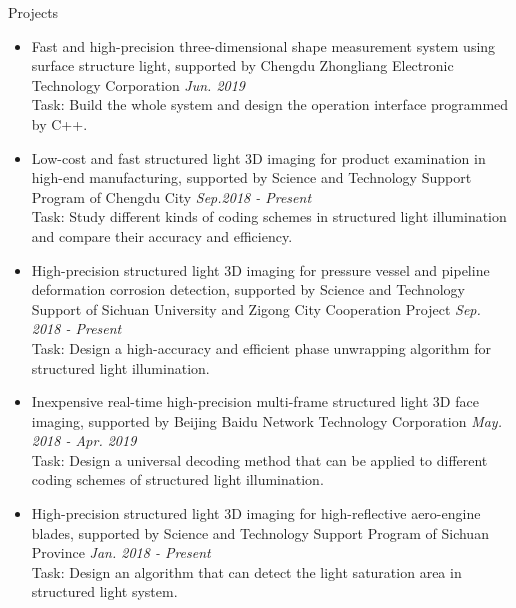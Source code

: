 \documentclass{resume} %
\begin{document}
\begin{rSection}{Projects}
	\begin{itemize}[leftmargin=*]
		\item Fast and high-precision three-dimensional shape measurement system using surface structure light, supported by Chengdu Zhongliang Electronic Technology Corporation \hfill{\em Jun. 2019}\vspace{1.5mm}\\	
		Task: Build the whole system and design the operation interface programmed by C++.
		
		\item  Low-cost and fast structured light 3D imaging for product examination in high-end manufacturing, supported by Science and Technology Support Program of Chengdu City 
		\hfill {\em Sep.2018 - Present}\vspace{1.5mm}\\
		Task: Study different kinds of coding schemes in structured light illumination and compare their accuracy and efficiency.
		
		\item  High-precision structured light 3D imaging for pressure vessel and pipeline deformation corrosion detection, supported by Science and Technology Support of Sichuan University and Zigong City Cooperation Project \hfill {\em Sep. 2018 - Present}\vspace{1.5mm}\\
		Task: Design a high-accuracy and efficient phase unwrapping algorithm for structured light illumination.
		
		\item  Inexpensive real-time high-precision multi-frame structured light 3D face imaging, supported by Beijing Baidu Network Technology Corporation 
		\hfill {\em May. 2018 - Apr. 2019}\vspace{1.5mm}\\
		Task: Design a universal decoding method that can be applied to different coding schemes of structured light illumination.
				
		\item  High-precision structured light 3D imaging for high-reflective aero-engine blades, supported by Science and Technology Support Program of Sichuan Province 
		\hfill {\em Jan. 2018 - Present}\vspace{1.5mm}\\
		Task: Design an algorithm that can detect the light saturation area in structured light system.
		

\end{itemize}
\end{rSection}
\end{document}
